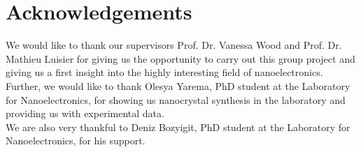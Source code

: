 \chapter*{Acknowledgements}

We would like to thank our supervisors Prof. Dr. Vanessa Wood and Prof. Dr. Mathieu Luisier for giving us the opportunity to
carry out this group project and giving us a first insight into the highly interesting field of nanoelectronics. \\

Further, we would like to thank Olesya Yarema, PhD student at the Laboratory for Nanoelectronics, for showing us
nanocrystal synthesis in the laboratory and providing us with experimental data. \\
 
We are also very thankful to Deniz Bozyigit, PhD student at the Laboratory for Nanoelectronics,
for his support.